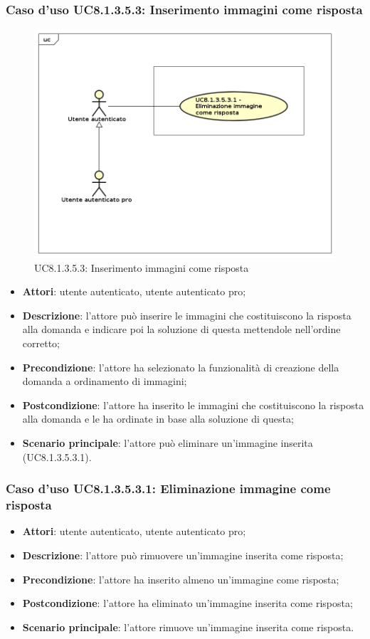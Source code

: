 \subsubsection{Caso d'uso UC8.1.3.5.3: Inserimento immagini come risposta}
\label{UC8.1.3.5.3}
\begin{figure}[h]
	\centering
	\includegraphics[scale=0.45,keepaspectratio]{UML/UC8_1_3_5_3.png}
	\caption{UC8.1.3.5.3: Inserimento immagini come risposta}
\end{figure}
\begin{itemize}
	\item\textbf{Attori}: utente autenticato, utente autenticato pro;
	\item\textbf{Descrizione}: l'attore può inserire le immagini che costituiscono la risposta alla domanda e indicare poi la soluzione di questa mettendole nell'ordine corretto;
	\item\textbf{Precondizione}: l'attore ha selezionato la funzionalità di creazione della domanda a ordinamento di immagini; 
	\item \textbf{Postcondizione}: l'attore ha inserito le immagini che costituiscono la risposta alla domanda e le ha ordinate in base alla soluzione di questa;
	\item\textbf{Scenario principale}: l'attore può eliminare un'immagine inserita (UC8.1.3.5.3.1).
\end{itemize}
\subsubsection{Caso d'uso UC8.1.3.5.3.1: Eliminazione immagine come risposta}
\begin{itemize}
	\item\textbf{Attori}: utente autenticato, utente autenticato pro;
	\item\textbf{Descrizione}: l'attore può rimuovere un'immagine inserita come risposta;
	\item\textbf{Precondizione}: l'attore ha inserito almeno un'immagine come risposta; 
	\item \textbf{Postcondizione}: l'attore ha eliminato un'immagine inserita come risposta;
	\item\textbf{Scenario principale}: l'attore rimuove un'immagine inserita come risposta. 
\end{itemize}
